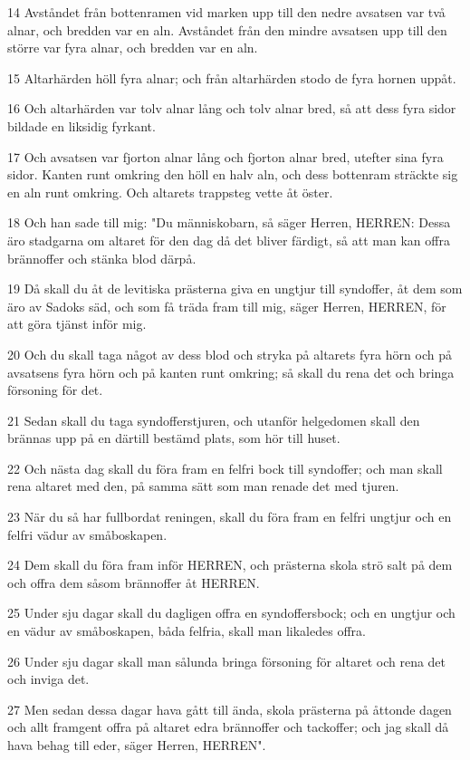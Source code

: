 \par 14 Avståndet från bottenramen vid marken upp till den nedre avsatsen var två alnar, och bredden var en aln. Avståndet från den mindre avsatsen upp till den större var fyra alnar, och bredden var en aln.
\par 15 Altarhärden höll fyra alnar; och från altarhärden stodo de fyra hornen uppåt.
\par 16 Och altarhärden var tolv alnar lång och tolv alnar bred, så att dess fyra sidor bildade en liksidig fyrkant.
\par 17 Och avsatsen var fjorton alnar lång och fjorton alnar bred, utefter sina fyra sidor. Kanten runt omkring den höll en halv aln, och dess bottenram sträckte sig en aln runt omkring. Och altarets trappsteg vette åt öster.
\par 18 Och han sade till mig: "Du människobarn, så säger Herren, HERREN: Dessa äro stadgarna om altaret för den dag då det bliver färdigt, så att man kan offra brännoffer och stänka blod därpå.
\par 19 Då skall du åt de levitiska prästerna giva en ungtjur till syndoffer, åt dem som äro av Sadoks säd, och som få träda fram till mig, säger Herren, HERREN, för att göra tjänst inför mig.
\par 20 Och du skall taga något av dess blod och stryka på altarets fyra hörn och på avsatsens fyra hörn och på kanten runt omkring; så skall du rena det och bringa försoning för det.
\par 21 Sedan skall du taga syndofferstjuren, och utanför helgedomen skall den brännas upp på en därtill bestämd plats, som hör till huset.
\par 22 Och nästa dag skall du föra fram en felfri bock till syndoffer; och man skall rena altaret med den, på samma sätt som man renade det med tjuren.
\par 23 När du så har fullbordat reningen, skall du föra fram en felfri ungtjur och en felfri vädur av småboskapen.
\par 24 Dem skall du föra fram inför HERREN, och prästerna skola strö salt på dem och offra dem såsom brännoffer åt HERREN.
\par 25 Under sju dagar skall du dagligen offra en syndoffersbock; och en ungtjur och en vädur av småboskapen, båda felfria, skall man likaledes offra.
\par 26 Under sju dagar skall man sålunda bringa försoning för altaret och rena det och inviga det.
\par 27 Men sedan dessa dagar hava gått till ända, skola prästerna på åttonde dagen och allt framgent offra på altaret edra brännoffer och tackoffer; och jag skall då hava behag till eder, säger Herren, HERREN".

